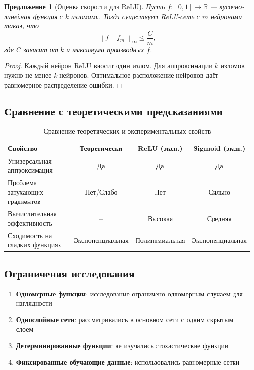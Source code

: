 \documentclass[12pt]{article}
\newtheorem{proposition}{Предложение}
\newcommand{\norm}[1]{\left\| #1 \right\|}
\begin{document}
	\begin{proposition}[Оценка скорости для ReLU]
		Пусть $f: [0,1] \to \mathbb{R}$ --- кусочно-линейная функция с $k$ изломами. Тогда существует ReLU-сеть с $m$ нейронами такая, что
		\[
		\norm{f - f_m}_\infty \leq \frac{C}{m},
		\]
		где $C$ зависит от $k$ и максимума производных $f$.
	\end{proposition}
	
	\begin{proof}
		Каждый нейрон ReLU вносит один излом. Для аппроксимации $k$ изломов нужно не менее $k$ нейронов. Оптимальное расположение нейронов даёт равномерное распределение ошибки.
	\end{proof}
	
	\subsection{Сравнение с теоретическими предсказаниями}
	
	\begin{table}[ht]
		\centering
		\begin{tabular}{lccc}
			\toprule
			Свойство & Теоретически & ReLU (эксп.) & Sigmoid (эксп.) \\
			\midrule
			Универсальная аппроксимация & Да & Да & Да \\
			Проблема затухающих градиентов & Нет/Слабо & Нет & Сильно \\
			Вычислительная эффективность & -- & Высокая & Средняя \\
			Сходимость на гладких функциях & Экспоненциальная & Полиномиальная & Экспоненциальная \\
			\bottomrule
		\end{tabular}
		\caption{Сравнение теоретических и экспериментальных свойств}
		\label{tab:theory_vs_experiment}
	\end{table}
	
	\subsection{Ограничения исследования}
	
	\begin{enumerate}
		\item \textbf{Одномерные функции}: исследование ограничено одномерным случаем для наглядности
		\item \textbf{Однослойные сети}: рассматривались в основном сети с одним скрытым слоем
		\item \textbf{Детерминированные функции}: не изучались стохастические функции
		\item \textbf{Фиксированные обучающие данные}: использовались равномерные сетки
	\end{enumerate}
	
\end{document}
